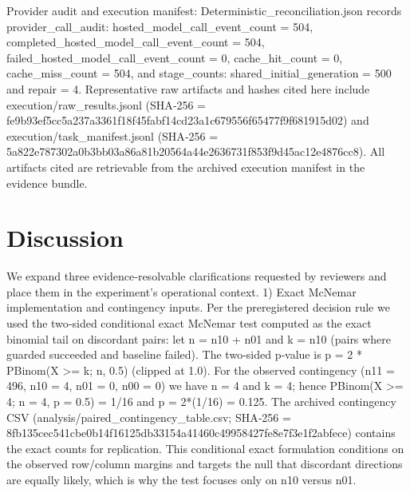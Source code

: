 \documentclass[conference]{IEEEtran}
\begin{document}
Provider audit and execution manifest: Deterministic\_reconciliation.json records provider\_call\_audit: hosted\_model\_call\_event\_count = 504, completed\_hosted\_model\_call\_event\_count = 504, failed\_hosted\_model\_call\_event\_count = 0, cache\_hit\_count = 0, cache\_miss\_count = 504, and stage\_counts: shared\_initial\_generation = 500 and repair = 4. Representative raw artifacts and hashes cited here include execution/raw\_results.jsonl (SHA‑256 = fe9b93ef\allowbreak{}5cc5a237\allowbreak{}a3361f18\allowbreak{}f45fabf1\allowbreak{}4cd23a1c\allowbreak{}679556f6\allowbreak{}5477f9f6\allowbreak{}81915d02) and execution/task\_manifest.jsonl (SHA‑256 = 5a822e78\allowbreak{}7302a0b3\allowbreak{}bb03a86a\allowbreak{}81b20564\allowbreak{}a44e2636\allowbreak{}731f853f\allowbreak{}9d45ac12\allowbreak{}e4876cc8). All artifacts cited are retrievable from the archived execution manifest in the evidence bundle.

\section{Discussion}
We expand three evidence‑resolvable clarifications requested by reviewers and place them in the experiment's operational context. 1) Exact McNemar implementation and contingency inputs. Per the preregistered decision rule we used the two‑sided conditional exact McNemar test computed as the exact binomial tail on discordant pairs: let n = n10 + n01 and k = n10 (pairs where guarded succeeded and baseline failed). The two‑sided p‑value is p = 2 * PBinom(X >= k; n, 0.5) (clipped at 1.0). For the observed contingency (n11 = 496, n10 = 4, n01 = 0, n00 = 0) we have n = 4 and k = 4; hence PBinom(X >= 4; n = 4, p = 0.5) = 1/16 and p = 2*(1/16) = 0.125. The archived contingency CSV (analysis/paired\_contingency\_table.csv; SHA‑256 = 8fb135ce\allowbreak{}c541cbe0\allowbreak{}b14f1612\allowbreak{}5db33154\allowbreak{}a41460c4\allowbreak{}9958427f\allowbreak{}e8e7f3e1\allowbreak{}f2abfece) contains the exact counts for replication. This conditional exact formulation conditions on the observed row/column margins and targets the null that discordant directions are equally likely, which is why the test focuses only on n10 versus n01.
\end{document}
